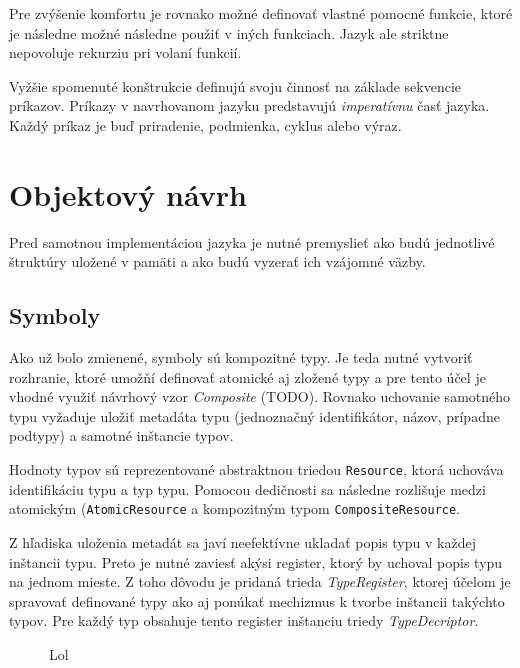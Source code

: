 Pre zvýšenie komfortu je rovnako možné definovať vlastné pomocné funkcie, ktoré je následne možné následne použiť v iných funkciach. 
Jazyk ale striktne nepovoluje rekurziu pri volaní funkcií.

Vyžšie spomenuté konštrukcie definujú svoju činnosť na základe sekvencie príkazov. Príkazy v navrhovanom jazyku predstavujú \textit{imperatívnu} časť jazyka.
Každý príkaz je buď priradenie, podmienka, cyklus alebo výraz.


\section{Objektový návrh}
Pred samotnou implementáciou jazyka je nutné premyslieť ako budú jednotlivé štruktúry uložené v pamäti a ako budú vyzerať ich vzájomné väzby.
\subsection{Symboly}
Ako už bolo zmienené, symboly sú kompozitné typy. Je teda nutné vytvoriť rozhranie, ktoré umožňí definovať atomické aj zložené typy a pre tento účel je vhodné využiť návrhový vzor \textit{Composite} (TODO).  Rovnako uchovanie samotného typu vyžaduje uložiť metadáta typu (jednoznačný identifikátor, názov, prípadne podtypy) a samotné inštancie typov. 

Hodnoty typov sú reprezentované abstraktnou triedou \texttt{Resource}, ktorá uchováva identifikáciu typu a typ typu. Pomocou dedičnosti sa následne rozlišuje medzi atomickým (\texttt{AtomicResource} a kompozitným typom \texttt{CompositeResource}.

Z hľadiska uloženia metadát sa javí neefektívne ukladať popis typu v každej inštancii typu. Preto je nutné zaviesť akýsi register, ktorý by uchoval popis typu na jednom mieste. Z toho dôvodu je pridaná trieda \textit{TypeRegister}, ktorej účelom je spravovať definované typy ako aj ponúkať mechizmus k tvorbe inštancii takýchto typov. 
Pre každý typ obsahuje tento register inštanciu triedy \textit{TypeDecriptor}. 

\begin{figure}[ht]
\caption{Lol}
\centering
{}
\end{figure}

